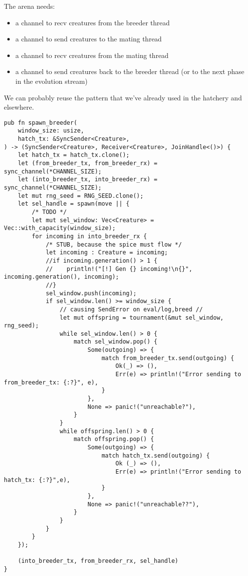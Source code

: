 \documentclass[11pt]{article}
\begin{document}
The arena needs:
\begin{itemize}
\item a channel to recv creatures from the breeder thread
\item a channel to send creatures to the mating thread
\item a channel to recv creatures from the mating thread
\item a channel to send creatures back to the breeder thread
(or to the next phase in the evolution stream)
\end{itemize}

We can probably reuse the pattern that we've already used in
the hatchery and elsewhere. 


\lstset{language=rust,label=orge86a67c,caption= ,captionpos=b,numbers=none}
\begin{lstlisting}
pub fn spawn_breeder(
    window_size: usize,
    hatch_tx: &SyncSender<Creature>,
) -> (SyncSender<Creature>, Receiver<Creature>, JoinHandle<()>) {
    let hatch_tx = hatch_tx.clone();
    let (from_breeder_tx, from_breeder_rx) = sync_channel(*CHANNEL_SIZE);
    let (into_breeder_tx, into_breeder_rx) = sync_channel(*CHANNEL_SIZE);
    let mut rng_seed = RNG_SEED.clone();
    let sel_handle = spawn(move || {
        /* TODO */
        let mut sel_window: Vec<Creature> = Vec::with_capacity(window_size);
        for incoming in into_breeder_rx {
            /* STUB, because the spice must flow */
            let incoming : Creature = incoming;
            //if incoming.generation() > 1 {
            //    println!("[!] Gen {} incoming!\n{}", incoming.generation(), incoming);
            //}
            sel_window.push(incoming);
            if sel_window.len() >= window_size {
                // causing SendError on eval/log,breed //
                let mut offspring = tournament(&mut sel_window, rng_seed);
                while sel_window.len() > 0 {
                    match sel_window.pop() {
                        Some(outgoing) => {
                            match from_breeder_tx.send(outgoing) {
                                Ok(_) => (),
                                Err(e) => println!("Error sending to from_breeder_tx: {:?}", e),
                            }
                        },
                        None => panic!("unreachable?"),
                    }
                }
                while offspring.len() > 0 {
                    match offspring.pop() {
                        Some(outgoing) => {
                            match hatch_tx.send(outgoing) {
                                Ok (_) => (),
                                Err(e) => println!("Error sending to hatch_tx: {:?}",e),
                            }
                        },
                        None => panic!("unreachable??"),
                    }
                }
            }
        }
    });

    (into_breeder_tx, from_breeder_rx, sel_handle)
}
\end{lstlisting}
\end{document}
